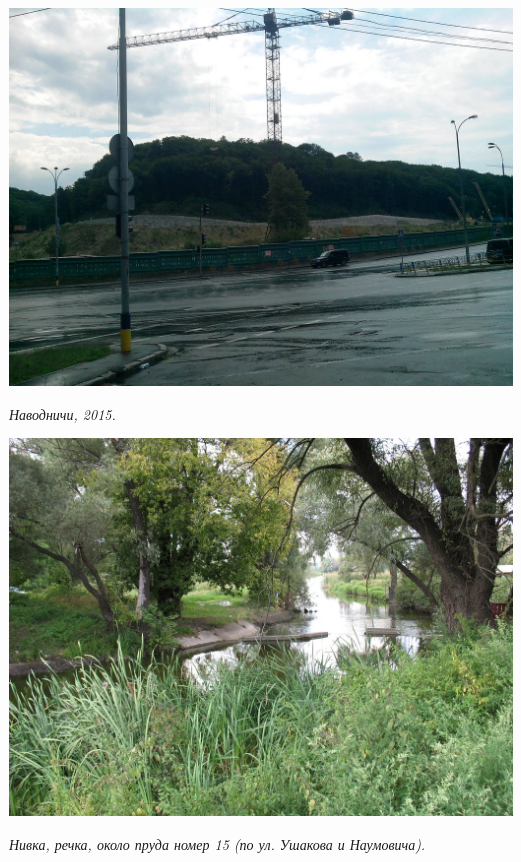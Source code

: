 \begin{center}
\includegraphics[width=\linewidth]{rpix/IMG_20150701_144629.jpg}

\textit{Наводничи, 2015.}
\end{center}


\begin{center}
\includegraphics[width=0.93\linewidth]{rpix/IMG_3981.JPG}

\textit{Нивка, речка, около пруда номер 15 (по ул. Ушакова и Наумовича).}
\end{center}

